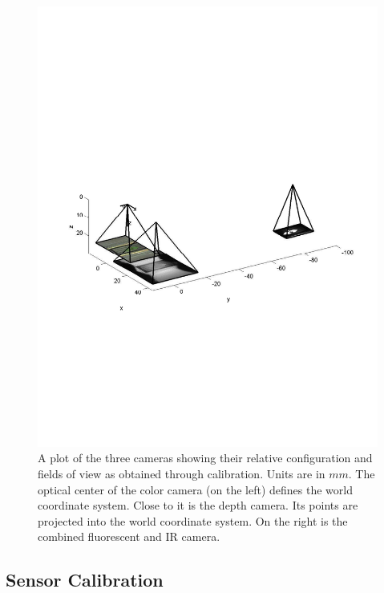 
\begin{figure}
  \includegraphics[width=\linewidth,trim=50 230 45 300,clip]{Figures/CameraConfiguration}
\caption{A plot of the three cameras showing their relative configuration and fields of view as obtained through calibration.  Units are in $mm$.  The optical center of the color camera (on the left) defines the world coordinate system.  Close to it is the depth camera.  Its points are projected into the world coordinate system.  On the right is the combined fluorescent and IR camera.}
\label{fig:CameraConfiguration}
\end{figure}


\subsection{Sensor Calibration}

